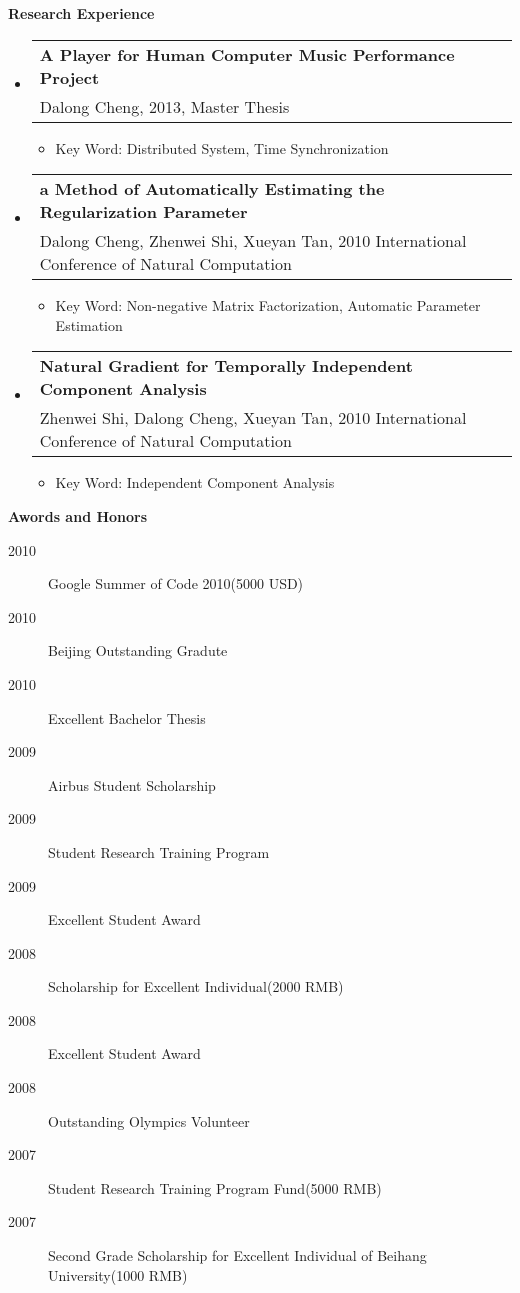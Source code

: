 \documentclass[letterpaper,11pt]{article}
\makeatletter
\newcommand{\resitem}[1]{\item #1 \vspace{-2pt}}
\newcommand{\resheading}[1]{{\large \colorbox{mygrey}{\begin{minipage}{\textwidth}{\textbf{#1 \vphantom{p\^{E}}}}\end{minipage}}}}
\newcommand{\ressubheading}[4]{
\begin{tabular*}{6.5in}{l@{\extracolsep{\fill}}r}
		\textbf{#1} & #2 \\
		{#3}{} & \textit{#4} \\
\end{tabular*}\vspace{-6pt}}
\makeatother
\begin{document}
\resheading{Research Experience}
  \begin{itemize}

  \item 
		\ressubheading{A Player for Human Computer Music Performance Project}{}{Dalong Cheng, 2013, Master Thesis}{}
			{ \footnotesize
				\begin{itemize}
					\resitem{Key Word: Distributed System, Time Synchronization}
				\end{itemize}
			}


	
	\item
		\ressubheading{a Method of Automatically Estimating the Regularization Parameter}{}
    {Dalong Cheng, Zhenwei Shi, Xueyan Tan, 2010 International Conference of Natural Computation}{}
			{ \footnotesize
				\begin{itemize}
					\resitem{Key Word: Non-negative Matrix Factorization, Automatic Parameter Estimation}
				\end{itemize}
      }

		\item 
			\ressubheading{Natural Gradient for Temporally Independent Component Analysis}{}{Zhenwei Shi, Dalong Cheng, Xueyan Tan, 2010 International Conference of Natural Computation}{}
			{ \footnotesize
				\begin{itemize}
					\resitem{Key Word: Independent Component Analysis}
				\end{itemize}
			}

	\end{itemize}  %

\resheading{{Awords and Honors}}
	\begin{description}
        \item[2010] {Google Summer of Code 2010(5000 USD)}
        \item[2010] {Beijing Outstanding Gradute}
	    \item[2010] {Excellent Bachelor Thesis}
        \item[2009] {Airbus Student Scholarship}
        \item[2009] {Student Research Training Program}
        \item[2009] {Excellent Student Award}
        \item[2008] {Scholarship for Excellent Individual(2000 RMB)}
        \item[2008] {Excellent Student Award}
        \item[2008] {Outstanding Olympics Volunteer}
        \item[2007] {Student Research Training Program Fund(5000 RMB)}
        \item[2007] {Second Grade Scholarship for Excellent Individual of Beihang University(1000 RMB)}
	
	\end{description}
    
\end{document}
